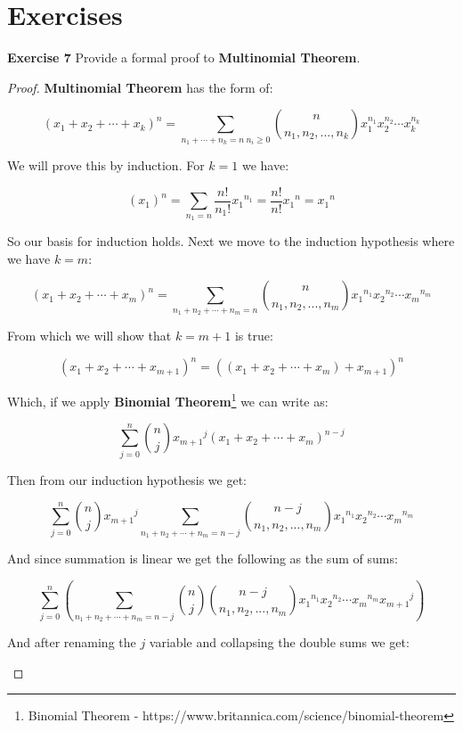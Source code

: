 \documentclass[a4paper]{article}
\begin{document}
\section{Exercises}
\noindent \textbf{Exercise 7}  Provide a formal proof to \textbf{Multinomial Theorem}.
\begin{proof}
\textbf{Multinomial Theorem} has the form of:
\begin{center}
$$(x_1 + x_2 + \cdots + x_k)^n = \sum_{n_1+\cdots +n_k = n\ n_i \geq 0}^{} \binom{n}{n_1, n_2, ..., n_k}x_{1}^{n_{1}}x_{2}^{n_{2}}\cdots x_{k}^{n_{k}}$$
\end{center}
We will prove this by induction. For $k=1$ we have:
\begin{center}
$$(x_1)^n = \sum_{n_1 = n} \frac{n!}{n_1!} {x_1}^{n_1} =  \frac{n!}{n!} {x_1}^{n} = {x_1}^{n}$$
\end{center}
So our basis for induction holds. Next we move to the induction hypothesis where we have $k=m$:
\begin{center}
$$(x_1 + x_2 + \cdots + x_m)^n = \sum_{n_1 + n_2 + \cdots \mathop + n_m = n} \binom{n}{n_1, n_2, ..., n_m} {x_1}^{n_1} {x_2}^{n_2} \cdots {x_m}^{n_m}$$
\end{center}
From which we will show that $k=m+1$ is true:
\begin{center}
$$(x_1 + x_2 + \cdots + x_{m+1})^n = ((x_1 + x_2 + \cdots + x_m) + x_{m+1})^n$$
\end{center}
Which, if we apply \textbf{Binomial Theorem}\footnote{Binomial Theorem - https://www.britannica.com/science/binomial-theorem} we can write as:
\begin{center}
$$\sum_{j = 0}^{n} \binom{n}{j} {x_{m+ 1} }^j (x_1 + x_2 + \cdots + x_m)^{n - j}$$
\end{center}
Then from our induction hypothesis we get:
\begin{center}
$$\sum_{j = 0}^{n} \binom{n}{j} {x_{m + 1} }^j \sum_{n_1 + n_2 + \cdots + n_m = n - j} \binom{n - j}{n_1, n_2, ..., n_m} {x_1}^{n_1} {x_2}^{n_2} \cdots {x_m}^{n_m}$$
\end{center}
And since summation is linear we get the following as the sum of sums:
\begin{center}
$$\sum_{j = 0}^{n} \left(\sum_{n_1 + n_2 + \cdots + n_m = n - j} \binom{n}{j} \binom{n - j}{n_1, n_2, ..., n_m} {x_1}^{n_1} {x_2}^{n_2} \cdots {x_m}^{n_m} {x_{m + 1} }^j \right)$$
\end{center}
And after renaming the $j$ variable and collapsing the double sums we get:
\begin{center}

\end{center}
\end{proof}
\end{document}
